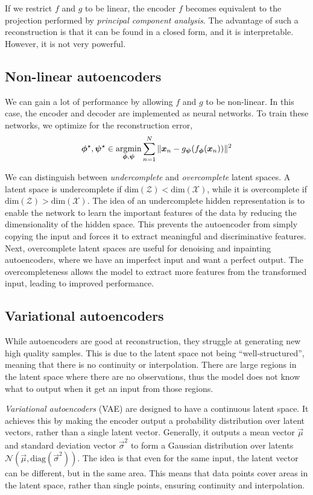 If we restrict $f$ and $g$ to be linear, the encoder $f$ becomes equivalent to the projection
performed by \textit{principal component analysis}. The advantage of such a reconstruction is that
it can be found in a closed form, and it is interpretable. However, it is not very powerful.

\subsection{Non-linear autoencoders}

We can gain a lot of performance by allowing $f$ and $g$ to be non-linear. In this case, the
encoder and decoder are implemented as neural networks. To train these networks, we optimize for
the reconstruction error, \[
    \bm{\phi}^\star, \bm{\psi}^\star \in \operatorname*{argmin}_{\bm{\phi}, \bm{\psi}} \sum_{n=1}^{N} \| \bm{x}_n - g_{\bm{\psi}} (f_{\bm{\phi}}(\bm{x}_n)) \|^2
\]

We can distinguish between \textit{undercomplete} and \textit{overcomplete} latent spaces. A latent
space is undercomplete if $\mathrm{dim}(\mathcal{Z}) < \mathrm{dim}(\mathcal{X})$, while it is
overcomplete if $\mathrm{dim}(\mathcal{Z}) > \mathrm{dim}(\mathcal{X})$. The idea of an
undercomplete hidden representation is to enable the network to learn the important features of the
data by reducing the dimensionality of the hidden space. This prevents the autoencoder from simply
copying the input and forces it to extract meaningful and discriminative features. Next,
overcomplete latent spaces are useful for denoising and inpainting autoencoders, where we have an
imperfect input and want a perfect output. The overcompleteness allows the model to extract more
features from the transformed input, leading to improved performance.

\subsection{Variational autoencoders}

While autoencoders are good at reconstruction, they struggle at generating new high quality
samples. This is due to the latent space not being ``well-structured'', meaning that there is no
continuity or interpolation. There are large regions in the latent space where there are no
observations, thus the model does not know what to output when it get an input from those regions.

\textit{Variational autoencoders} (VAE) \citep{kingma2013auto} are designed to have a continuous
latent space. It achieves this by making the encoder output a probability distribution over latent
vectors, rather than a single latent vector. Generally, it outputs a mean vector $\vec{\mu}$ and
standard deviation vector $\vec{\sigma}^2$ to form a Gaussian distribution over latents
$\mathcal{N}(\vec{\mu}, \mathrm{diag}(\vec{\sigma}^2))$. The idea is that even for the same input, the
latent vector can be different, but in the same area. This means that data points cover areas in the
latent space, rather than single points, ensuring continuity and interpolation.

